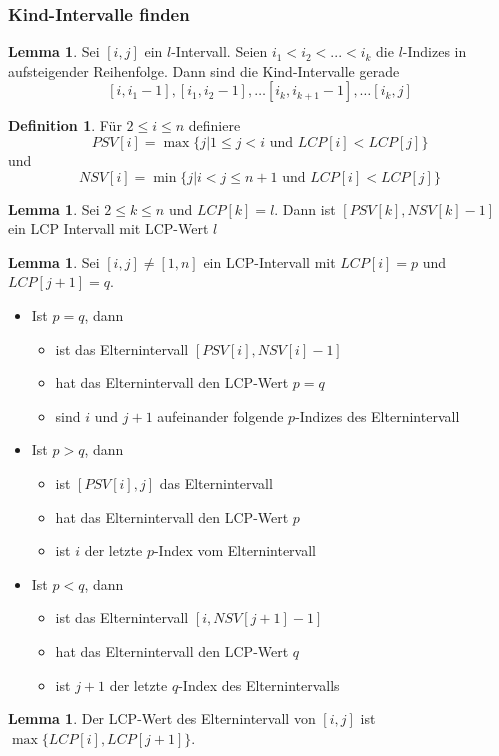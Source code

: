 \documentclass[a4paper, 12pt]{article}
\theoremstyle{plain}
\theoremstyle{definition}
\newtheorem{definition}[theorem]{Definition} %
\theoremstyle{lemma}
\newtheorem{lemma}[theorem]{Lemma}
\theoremstyle{remark}
\theoremstyle{corollary}
\theoremstyle{example}
\begin{document}
	\subsubsection{Kind-Intervalle finden}
	\begin{lemma}
		Sei $[i,j]$ ein $l$-Intervall. Seien $i_1 < i_2 <...<i_k$ die $l$-Indizes in aufsteigender Reihenfolge. Dann sind die Kind-Intervalle gerade \[[i,i_1-1], [i_1,i_2-1], \dots [i_k,i_{k+1}-1], \dots [i_k, j]\]
	\end{lemma}
	\begin{definition}
		Für $2\leq i \leq n$ definiere \[PSV[i] = \max\{j | 1\leq j < i \text{ und } LCP[i] < LCP[j]\}\]
		und \[NSV[i] = \min\{j | i < j \leq n+1 \text{ und } LCP[i] < LCP[j]\}\]
	\end{definition}
	\begin{lemma}
		Sei $2 \leq k \leq n$ und $LCP[k] = l$. Dann ist $[PSV[k], NSV[k]-1]$ ein LCP Intervall mit LCP-Wert $l$
	\end{lemma}
	\begin{lemma}
		Sei $[i,j] \neq [1,n]$ ein LCP-Intervall mit $LCP[i] = p$ und $LCP[j+1] = q$. \begin{itemize}
			\item Ist $p=q$, dann \begin{itemize}
				\item ist das Elternintervall $[PSV[i],NSV[i]-1]$
				\item hat das Elternintervall den LCP-Wert $p=q$
				\item sind $i$ und $j+1$ aufeinander folgende $p$-Indizes des Elternintervall
			\end{itemize}
			\item Ist $p>q$, dann \begin{itemize}
				\item ist $[PSV[i],j]$ das Elternintervall 
				\item hat das Elternintervall den LCP-Wert $p$
				\item ist $i$ der letzte $p$-Index vom Elternintervall
			\end{itemize}
			\item Ist $p<q$, dann \begin{itemize}
				\item ist das Elternintervall $[i,NSV[j+1]-1]$
				\item hat das Elternintervall den LCP-Wert $q$
				\item ist $j+1$ der letzte $q$-Index des Elternintervalls
			\end{itemize}
		\end{itemize}
	\end{lemma}
	\begin{lemma}
		Der LCP-Wert des Elternintervall von $[i,j]$ ist $\max\{LCP[i],LCP[j+1]\}$.
	\end{lemma}
\end{document}
